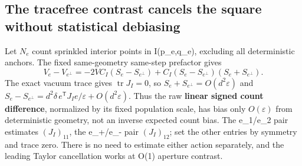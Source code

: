 \documentclass[11pt]{article}
\begin{document}
\subsection{The tracefree contrast cancels the square without statistical debiasing}\label{the-tracefree-contrast-cancels-the-square-without-statistical-debiasing}

Let \(N_e\) count sprinkled interior points in I(p\_e,q\_e), excluding all deterministic anchors. The fixed same-geometry same-step prefactor gives
\[
 V_{e}-V_{e^\perp}
 = -2V C_I(S_e-S_{e^\perp})
     +C_I(S_e-S_{e^\perp})(S_e+S_{e^\perp}).
\]
The exact vacuum trace gives \(\operatorname{tr} J_I=0\), so
\(S_e+S_{e^\perp}=O(d^2\varepsilon)\) and
\(S_e-S_{e^\perp}=d^2\delta\, e^{\mathsf T}J_I e/\varepsilon+O(d^2\varepsilon)\).
Thus the raw \textbf{linear signed count difference}, normalized by its fixed population scale, has bias only \(O(\varepsilon)\) from deterministic geometry, not an inverse expected count bias. The e\_1/e\_2 pair estimates \((J_I)_{11}\), the e\_+/e\_- pair \((J_I)_{12}\); set the other entries by symmetry and trace zero. There is no need to estimate either action separately, and the leading Taylor cancellation works at O(1) aperture contrast.
\end{document}
